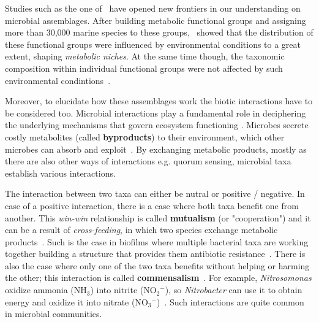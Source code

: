       Studies such as the one of~\citeauthor{louca2016decoupling}
      have opened new frontiers in our understanding on microbial assemblages. 
      After building metabolic functional groups and assigning more than 30,000 marine 
      species to these groups,~\citeauthor{louca2016decoupling} showed 
      that the distribution of these functional groups were influenced by environmental 
      conditions to a great extent, shaping \textit{metabolic niches}.
      At the same time though, the taxonomic composition within individual functional groups
      were not affected by such environmental condintions~\cite{louca2016decoupling}.

      \fi
      Moreover, to elucidate how these assemblages work the biotic interactions have to be 
      considered too. 
      Microbial interactions play a fundamental role in deciphering the underlying mechanisms that govern ecosystem functioning \cite{braga2016microbial, faust2012microbial}. 
      Microbes secrete costly metabolites (called \textbf{byproducts}) to their environment, 
      which other microbes can absorb and exploit~\cite{pacheco2019costless}.
      By exchanging metabolic products, mostly as there are also other ways of interactions 
      e.g. quorum sensing, microbial taxa establish various interactions. 
      
      The interaction between two taxa can either be nutral or 
      positive / negative.
      In case of a positive interaction, 
      there is a case where both taxa benefit one from another.
      This \textit{win-win} relationship is called \textbf{mutualism} (or "cooperation")
      and it can be a result of
      \textit{cross-feeding}, in which two species exchange metabolic products~\cite{faust2012microbial}.
      Such is the case in biofilms where multiple bacterial taxa are working together  
      building a structure that provides them antibiotic resistance~\cite{santos2019evolutionary}.
      There is also the case where only one of the two taxa
      benefits without helping or harming the other; 
      this interaction is called \textbf{commensalism}~\cite{faust2012microbial}. 
      For example, \textit{Nitrosomonas} oxidize ammonia (NH$_3$) into nitrite (NO${_2}^{-}$), so  
      \textit{Nitrobacter} can use it to obtain energy and oxidize it into nitrate (NO${_3}^{-}$)~\cite{laanbroek2002nitrite}.
      Such interactions are quite common in microbial communities.

